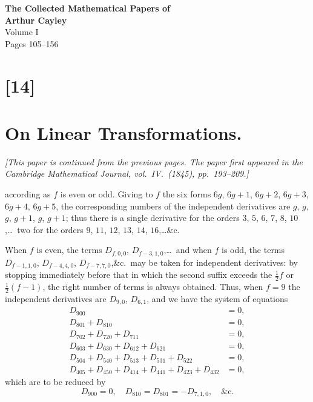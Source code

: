 \documentclass[11pt,a4paper]{book}
\begin{document}
\newpage
\setcounter{section}{14}
\clearpage


\begin{center}
{\LARGE\bfseries The Collected Mathematical Papers of}\\[0.5em]
{\LARGE\bfseries Arthur Cayley}\\[1em]
{\Large Volume I}\\[1em]
{\large Pages 105--156}\\[2em]
\end{center}


\newpage


\section*{[14]}
\section*{On Linear Transformations.}

\textit{[This paper is continued from the previous pages. The paper first appeared in the}
\textit{Cambridge Mathematical Journal, vol.~IV.~(1845), pp.~193--209.]}

\bigskip
\setcounter{page}{105}

according as $f$ is even or odd. Giving to $f$ the six forms
$6g$, $6g+1$, $6g+2$, $6g+3$, $6g+4$, $6g+5$,
the corresponding numbers of the independent derivatives are
$g$, $g$, $g$, $g+1$, $g$, $g+1$;
thus there is a single derivative for the orders $3$, $5$, $6$, $7$, $8$, $10$,\ldots\ two for the orders
$9$, $11$, $12$, $13$, $14$, $16$,\ldots\&c.

When $f$ is even, the terms $D_{f,0,0}$, $D_{f-3,1,0}$,\ldots\ and when $f$
is odd, the terms
$D_{f-1,1,0}$, $D_{f-4,4,0}$, $D_{f-7,7,0}$,\&c.\ may be taken for independent derivatives: by stopping
immediately before that in which the second suffix exceeds the $\frac{1}{2}f$ or
$\frac{1}{2}(f-1)$, the right number
of terms is always obtained. Thus, when $f=9$ the independent derivatives are $D_{9,0}$,
$D_{6,1}$, and we have the system of equations
\begin{align*}
D_{900} &= 0,\\
D_{801} + D_{810} &= 0,\\
D_{702} + D_{720} + D_{711} &= 0,\\
D_{603} + D_{630} + D_{612} + D_{621} &= 0,\\
D_{504} + D_{540} + D_{513} + D_{531} + D_{522} &= 0,\\
D_{405} + D_{450} + D_{414} + D_{441} + D_{423} + D_{432} &= 0,
\end{align*}
which are to be reduced by
\[
D_{900} = 0,\quad
D_{810} = D_{801} = -D_{7,1,0},\quad \&\text{c.}
\]
\end{document}

